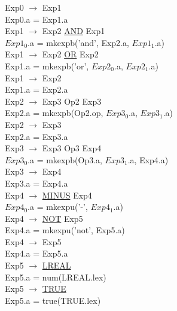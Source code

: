 \documentclass[\main/MemoriaPL.tex]{subfiles}
\begin{document}
    Exp0 $\rightarrow$ Exp1\\
    \hspace*{5mm}Exp0.a = Exp1.a\\
    Exp1 $\rightarrow$ Exp2 \underline{AND} Exp1\\
    \hspace*{5mm}$Exp1_0$.a = mkexpb('and', Exp2.a, $Exp1_1$.a)\\
    Exp1 $\rightarrow$ Exp2 \underline{OR} Exp2\\
    \hspace*{5mm}Exp1.a = mkexpb('or', $Exp2_0$.a, $Exp2_1$.a)\\
    Exp1 $\rightarrow$ Exp2\\
    \hspace*{5mm}Exp1.a = Exp2.a\\
    Exp2 $\rightarrow$ Exp3 Op2 Exp3\\
    \hspace*{5mm}Exp2.a = mkexpb(Op2.op, $Exp3_0$.a, $Exp3_1$.a)\\
    Exp2 $\rightarrow$ Exp3\\
    \hspace*{5mm}Exp2.a = Exp3.a\\
    Exp3 $\rightarrow$ Exp3 Op3 Exp4\\
    \hspace*{5mm}$Exp3_0$.a = mkexpb(Op3.a, $Exp3_1$.a, Exp4.a)\\
    Exp3 $\rightarrow$ Exp4\\
    \hspace*{5mm}Exp3.a = Exp4.a\\
    Exp4 $\rightarrow$ \underline{MINUS} Exp4\\
    \hspace*{5mm}$Exp4_0$.a = mkexpu('-', $Exp4_1$.a)\\
    Exp4 $\rightarrow$ \underline{NOT} Exp5\\
    \hspace*{5mm}Exp4.a = mkexpu('not', Exp5.a)\\
    Exp4 $\rightarrow$ Exp5\\
    \hspace*{5mm}Exp4.a = Exp5.a\\
    Exp5 $\rightarrow$ \underline{LREAL}\\
    \hspace*{5mm}Exp5.a = num(LREAL.lex)\\
    Exp5 $\rightarrow$ \underline{TRUE}\\
    \hspace*{5mm}Exp5.a = true(TRUE.lex)\\
\end{document}
